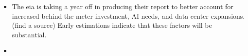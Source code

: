 \begin{itemize}
    \item The \gls{eia} is taking a year off in producing their report to better account for increased behind-the-meter investment, AI needs, and data center expansions. (find a source) Early estimations indicate that these factors will be substantial.
    \item 
\end{itemize}